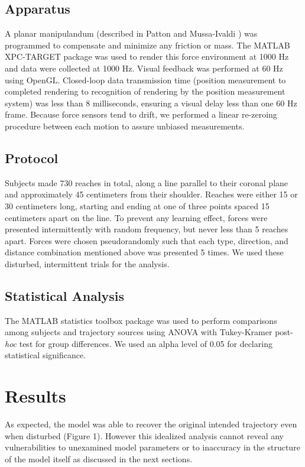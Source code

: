\documentclass[10pt]{article}
\begin{document}
\subsection*{Apparatus}
A planar manipulandum (described in Patton and Mussa-Ivaldi \cite{patton2004robot}) was programmed to compensate and minimize any friction or mass. The MATLAB XPC-TARGET package \cite{MATLAB:2008} was used to render this force environment at 1000 Hz and data were collected at 1000 Hz.  Visual feedback was performed at 60 Hz using OpenGL. Closed-loop data transmission time (position measurement to completed rendering to recognition of rendering by the position measurement system) was less than 8 milliseconds, ensuring a visual delay less than one 60 Hz frame. Because force sensors tend to drift, we performed a linear re-zeroing procedure between each motion to assure unbiased measurements. 

\subsection*{Protocol}
Subjects made 730 reaches in total, along a line parallel to their coronal plane and approximately 45 centimeters from their shoulder. Reaches were either 15 or 30 centimeters long, starting and ending at one of three points spaced 15 centimeters apart on the line. To prevent any learning effect, forces were presented intermittently with random frequency, but never less than 5 reaches apart. Forces were chosen pseudorandomly such that each type, direction, and distance combination mentioned above was presented 5 times. We used these disturbed, intermittent trials for the analysis. 

\subsection*{Statistical Analysis}
The MATLAB statistics toolbox package \cite{MATLAB:2008} was used to perform comparisons among subjects and trajectory sources using ANOVA with Tukey-Kramer post-\textit{hoc} test for group differences. We used an alpha level of 0.05 for declaring statistical significance.



\section*{Results}
As expected, the model was able to recover the original intended trajectory even when disturbed (Figure 1). However this idealized analysis cannot reveal any vulnerabilities to unexamined model parameters or to inaccuracy in the structure of the model itself as discussed in the next sections.
\end{document}
